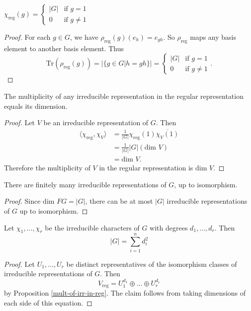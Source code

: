 \begin{lemma}
$\chi_{\text{reg}}(g) = \begin{cases} |G| &\text{if } g=1 \\ 0 &\text{if } g \neq 1 \end{cases}$
\end{lemma}
\begin{proof}
For each $g \in G$, we have $\rho_{\text{reg}} (g) (e_h) = e_{gh}$.  So $\rho_{\text{reg}}$ maps any basis element to another basis element.  
Thus \[ \text{Tr} (\rho_{\text{reg}} (g)) = | \{ g \in G | h=gh \} | = \begin{cases} |G| &\text{if } g=1 \\ 0 &\text{if } g \neq 1 \end{cases}. \]
\end{proof}

\begin{prop} \label{mult-of-irr-in-reg}
The multiplicity of any irreducible representation in the regular representation equals its dimension.
\end{prop}
\begin{proof}
Let $V$ be an irreducible representation of $G$.  Then
\begin{align*}
\langle \chi_{\text{reg}}, \chi_V \rangle &= \frac{1}{|G|} \chi_{\text{reg}}(1) \overline{\chi_V (1)} \\
&= \frac{1}{|G|} |G| (\text{dim } V) \\
&= \text{dim } V.
\end{align*}
Therefore the multiplicity of $V$ in the regular representation is $\text{dim } V$.
\end{proof}

\begin{cor}
There are finitely many irreducible representations of $G$, up to isomorphism.
\end{cor}
\begin{proof}
Since $\text{dim } FG = |G|$, there can be at most $|G|$ irreducible representations of $G$ up to isomorphism.
\end{proof}


\begin{cor}
Let $\chi_1, \ldots, \chi_r$ be the irreducible characters of $G$ with degrees $d_1, \ldots, d_r$.  Then
\[ |G| = \sum_{i=1}^n d_i^2 \]
\end{cor}
\begin{proof}
Let $U_1, \ldots, U_r$ be distinct representatives of the isomorphism classes of irreducible representations of $G$.  Then
\[ V_{\text{reg}} = U_1 ^ {d_1} \oplus \ldots \oplus U_r ^{d_r} \]
by Proposition \ref{mult-of-irr-in-reg}.  The claim follows from taking dimensions of each side of this equation.
\end{proof}


